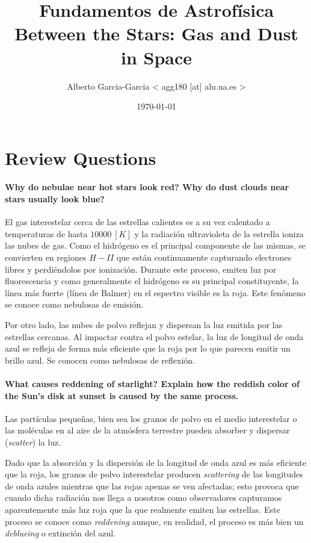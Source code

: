 \documentclass{tufte-handout}
\title{Fundamentos de Astrofísica\\ Between the Stars: Gas and Dust in Space}
\author[Alberto Garcia-Garcia]{Alberto Garcia-Garcia < agg180 [at] alu.ua.es >}
\date{\today}  %
\begin{document}
\maketitle%

\section{Review Questions}

\paragraph{\textbf{Why do nebulae near hot stars look red? Why do dust clouds near stars usually look blue?}}

El gas interestelar cerca de las estrellas calientes es a su vez calentado a temperaturas de hasta $10000~[K]$ y la radiación ultravioleta de la estrella ioniza las nubes de gas. Como el hidrógeno es el principal componente de las mismas, se convierten en regiones $H-II$ que están continuamente capturando electrones libres y perdiéndolos por ionización. Durante este proceso, emiten luz por fluorescencia y como generalmente el hidrógeno es su principal constituyente, la línea más fuerte (línea de Balmer) en el espectro visible es la roja. Este fenómeno se conoce como nebulosas de emisión.

Por otro lado, las nubes de polvo reflejan y dispersan la luz emitida por las estrellas cercanas. Al impactar contra el polvo estelar, la luz de longitud de onda azul se refleja de forma más eficiente que la roja por lo que parecen emitir un brillo azul. Se conocen como nebulosas de reflexión.

\paragraph{\textbf{What causes reddening of starlight? Explain how the reddish color of the Sun’s disk at sunset is caused by
the same process.}}

Las partículas pequeñas, bien sea los granos de polvo en el medio interestelar o las moléculas en al aire de la atmósfera terrestre pueden absorber y dispersar (\emph{scatter}) la luz.

Dado que la absorción y la dispersión de la longitud de onda azul es más eficiente que la roja, los granos de polvo interestelar producen \emph{scattering} de las longitudes de onda azules mientras que las rojas apenas se ven afectadas; esto provoca que cuando dicha radiación nos llega a nosotros como observadores capturamos aparentemente más luz roja que la que realmente emiten las estrellas. Este proceso se conoce como \emph{reddening} aunque, en realidad, el proceso es más bien un \emph{deblueing} o extinción del azul.
\end{document}
